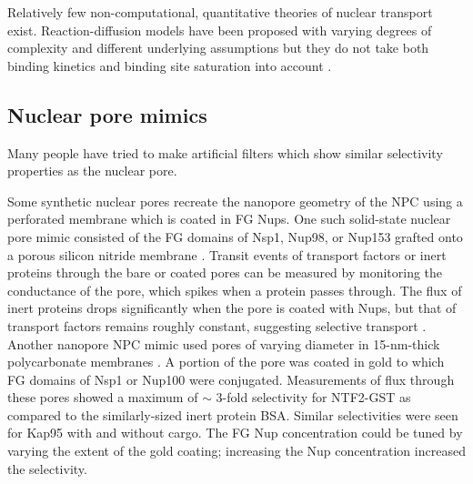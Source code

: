 
Relatively few non-computational, quantitative theories of nuclear transport exist.  Reaction-diffusion models have been proposed with varying degrees of complexity and different underlying assumptions but they do not take both binding kinetics and binding site saturation into account \cite{yang18,zilman07}.




\subsection{Nuclear pore mimics}

Many people have tried to make artificial filters which show similar selectivity properties as the nuclear pore.

Some synthetic nuclear pores recreate the nanopore geometry of the NPC using a perforated membrane which is coated in FG Nups.  One such solid-state nuclear pore mimic consisted of the FG domains of Nsp1, Nup98, or Nup153 grafted onto a porous silicon nitride membrane \cite{kowalczyk11,ananth18a}.  Transit events of transport factors or inert proteins through the bare or coated pores can be measured by monitoring the conductance of the pore, which spikes when a protein passes through.  The flux of inert proteins drops significantly when the pore is coated with Nups, but that of transport factors remains roughly constant, suggesting selective transport \cite{ananth18a}.  Another nanopore NPC mimic used pores of varying diameter in 15-nm-thick polycarbonate membranes \cite{jovanovic-talisman09}.  A portion of the pore was coated in gold to which FG domains of Nsp1 or Nup100 were conjugated.  Measurements of flux through these pores showed a maximum of $\sim$ 3-fold selectivity for NTF2-GST as compared to the similarly-sized inert protein BSA.  Similar selectivities were seen for Kap95 with and without cargo.  The FG Nup concentration could be tuned by varying the extent of the gold coating; increasing the Nup concentration increased the selectivity.

